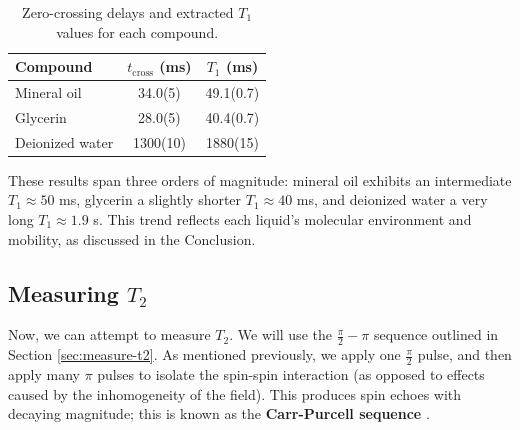 \documentclass[
    floatfix,  %
    reprint,
    amsmath,
    amssymb,
    aps,
]{revtex4-2}
\newcommand{\halfpi}{\frac{\pi}{2}}
\begin{document}

\begin{table}[htbp]
    \centering
    \caption{Zero-crossing delays and extracted $T_1$ values for each compound.}
    \label{tab:t1-results}
    \setlength{\tabcolsep}{12pt}
    \begin{tabular}{l S[table-format=6.0(2)] S[table-format=6.0(1)]}
        \toprule
        Compound         & {$t_{\mathrm{cross}}$ (\si{\milli\second})} & {$T_1$ (\si{\milli\second})} \\
        \midrule
        Mineral oil      & 34.0(5)    & 49.1(0.7)   \\
        Glycerin         & 28.0(5)    & 40.4(0.7)   \\
        Deionized water  & 1300(10)   & 1880(15)    \\
        \bottomrule
    \end{tabular}
\end{table}


These results span three orders of magnitude: mineral oil exhibits an intermediate $T_1\approx50$ ms, glycerin a slightly shorter $T_1\approx40$ ms, and deionized water a very long $T_1\approx1.9$ s. This trend reflects each liquid's molecular environment and mobility, as discussed in the Conclusion.








\subsection{Measuring $T_2$}

Now, we can attempt to measure $T_2$. We will use the $\halfpi-\pi$ sequence outlined in Section \ref{sec:measure-t2}. As mentioned previously, we apply one $\halfpi$ pulse, and then apply many $\pi$ pulses to isolate the spin-spin interaction (as opposed to effects caused by the inhomogeneity of the field). This produces spin echoes with decaying magnitude; this is known as the \textbf{Carr-Purcell sequence} \cite{carr_purcell1954,meiboom_gill1958}.
\end{document}
